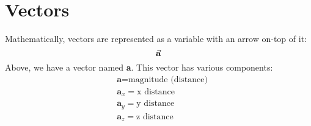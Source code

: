 \documentclass{article}
\begin{document}
\section{Vectors}
Mathematically, vectors are represented as a variable
with an arrow on-top of it:
\[\va{a}\]
Above, we have a vector named \textbf{a}. This vector has various components:
\begin{align*}
    & \textbf{a} = \text{magnitude (distance)} \\
    & \textbf{a}_x = \text{x distance} \\
    & \textbf{a}_y = \text{y distance} \\
    & \textbf{a}_z = \text{z distance}
\end{align*}

\end{document}
